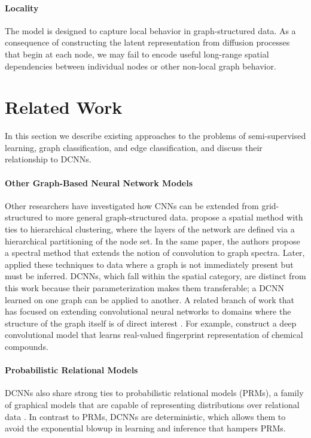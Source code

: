 \documentclass{article}
\begin{document}
\paragraph{Locality} The model is designed to capture local behavior in graph-structured data.  As a consequence of constructing the latent representation from diffusion processes that begin at each node, we may fail to encode useful long-range spatial dependencies between individual nodes or other non-local graph behavior.

\section{Related Work}
\label{sec:relatedwork}
In this section we  describe existing approaches to the problems of semi-supervised learning, graph classification, and edge classification, and discuss their relationship to DCNNs.
 
\paragraph{Other Graph-Based Neural Network Models} Other researchers have investigated how CNNs can be extended from grid-structured to more general graph-structured data.  \cite{DBLP:journals/corr/BrunaZSL13} propose a spatial method with ties to hierarchical clustering, where the layers of the network are defined via a hierarchical partitioning of the node set.  In the same paper, the authors propose a spectral method that extends the notion of convolution to graph spectra.  Later, \cite{Henaff:2015uw} applied these techniques to data where a graph is not immediately present but must be inferred.  DCNNs, which fall within the spatial category, are distinct from this work because their parameterization makes them transferable; a DCNN learned on one graph can be applied to another.  A related branch of work that has focused on extending convolutional neural networks to domains where the structure of the graph itself is of direct interest \cite{Scarselli:ku, Micheli:bn, Duvenaud:2015ww}.  For example, \cite{Duvenaud:2015ww} construct a deep convolutional model that learns real-valued fingerprint representation of chemical compounds.  

\paragraph{Probabilistic Relational Models} DCNNs also share strong ties to probabilistic relational models (PRMs), a family of graphical models that are capable of representing distributions over relational data \cite{Koller:2009:PGM:1795555}.  In contrast to PRMs, DCNNs are deterministic, which allows them to avoid the exponential blowup in learning and inference that hampers PRMs.  
\end{document}
